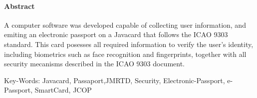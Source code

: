\documentclass{article}
\begin{document}
	\paragraph{\large Abstract}
		\begin{justify}

			\hspace{2cm} A computer software was developed capable of collecting user information, and emiting an electronic passport on a Javacard that follows the ICAO 9303 standard. This card posesses all required information to verify the user's identity, including biometrics such as face recognition and fingerprints, together with all security mecanisms described in the ICAO 9303 document.

	\vspace*{10px}
Key-Words: Javacard, Passaport,JMRTD, Security, Electronic-Passport, e-Passport, SmartCard, JCOP

		\end{justify}
	
	\newpage

	\tableofcontents
	\listoffigures
	\newpage

\end{document}
